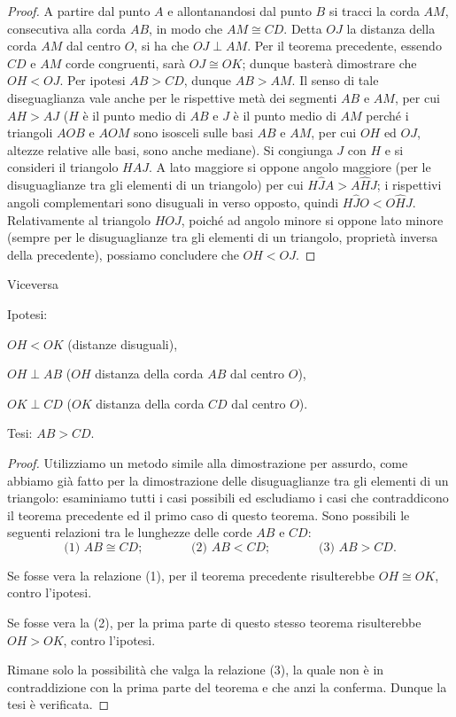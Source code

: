 \begin{proof}
A partire dal punto $A$ e allontanandosi dal punto $B$ si tracci la corda $AM$, consecutiva alla corda $AB$, in modo che $AM\cong CD$. Detta $OJ$ la distanza della corda $AM$ dal centro $O$, si ha che $OJ\perp AM$. Per il teorema precedente, essendo $CD$ e $AM$ corde congruenti, sarà $OJ\cong OK$; dunque basterà dimostrare che $OH < OJ$. Per ipotesi $AB > CD$, dunque $AB > AM$. Il senso di tale diseguaglianza vale anche per le rispettive metà dei segmenti $AB$ e $AM$, per cui $AH > AJ$ ($H$ è il punto medio di $AB$ e $J$ è il punto medio di $AM$ perché i triangoli $AOB$ e $AOM$ sono isosceli sulle basi $AB$ e $AM$, per cui $OH$ ed $OJ$, altezze relative alle basi, sono anche mediane).
Si congiunga $J$ con $H$ e si consideri il triangolo $HAJ$. A lato maggiore si oppone angolo maggiore (per le disuguaglianze tra gli elementi di un triangolo) per cui $H\widehat{J}A>A\widehat{H}J$; i rispettivi angoli complementari sono disuguali in verso opposto, quindi $H\widehat{J}O<O\widehat{H}J$. Relativamente al triangolo $HOJ$, poiché ad angolo minore si oppone lato minore (sempre per le disuguaglianze tra gli elementi di un triangolo, proprietà inversa della precedente), possiamo concludere che $OH < OJ$.
\end{proof}

Viceversa

\noindent Ipotesi:
\begin{itemize*}
\item $OH<OK$ (distanze disuguali),
\item $OH\perp AB$ ($OH$ distanza della corda $AB$ dal centro $O$),
\item $OK\perp CD$ ($OK$ distanza della corda $CD$ dal centro $O$).
\end{itemize*}
\noindent Tesi: $AB>CD$.

\begin{proof}
Utilizziamo un metodo simile alla dimostrazione per assurdo, come abbiamo già fatto per la dimostrazione delle disuguaglianze tra gli elementi di un triangolo: esaminiamo tutti i casi possibili ed escludiamo i casi che contraddicono il teorema precedente ed il primo caso di questo teorema.
Sono possibili le seguenti relazioni tra le lunghezze delle corde $AB$ e $CD$:
\[\text{(1) }AB\cong CD\text{;}\qquad\qquad\text{(2) }AB < CD\text{;}\qquad\qquad\text{(3) }AB > CD\text{.}\]

Se fosse vera la relazione (1), per il teorema precedente risulterebbe $OH\cong OK$, contro l'ipotesi.

Se fosse vera la (2), per la prima parte di questo stesso teorema risulterebbe $OH > OK$, contro l'ipotesi.

Rimane solo la possibilità che valga la relazione (3), la quale non è in contraddizione con la prima parte del teorema e che anzi la conferma. Dunque la tesi è verificata.
\end{proof}

